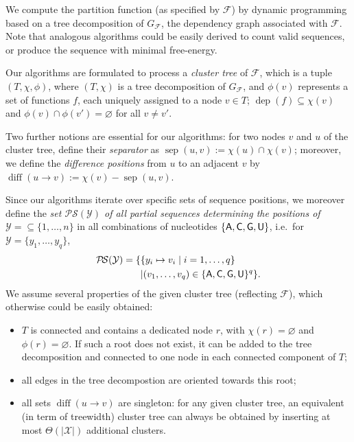 \documentclass[twocolumn]{bmcart}%
\newcommand{\dep}{\operatorname{dep}}
\newcommand{\separator}[2]{\operatorname{sep}(#1,#2)}
\newcommand{\difference}[2]{\operatorname{diff}(#1 \rightarrow #2)}
\newcommand{\partseqs}{\mathcal{P\!S}}
\newcommand{\F}{\mathcal{F}}
\newcommand{\X}{\mathcal{X}}
\newcommand{\Y}{\mathcal{Y}}
\newcommand{\Def}[1]{\emph{#1}}
\newcommand{\Nuc}[1]{{\sf #1}}
\newcommand{\Ab}{\Nuc{A}}
\newcommand{\Cb}{\Nuc{C}}
\newcommand{\Gb}{\Nuc{G}}
\newcommand{\Ub}{\Nuc{U}}
\begin{document}
We compute the partition function (as specified by $\F$) by dynamic programming based
on a tree decomposition of $G_{\F}$, the dependency graph associated with $\F$.
Note that analogous algorithms could be easily derived to count valid sequences, or produce the sequence with minimal free-energy.

%

Our algorithms are formulated to process a \Def{cluster tree} of $\F$, which is a tuple $(T,\chi,\phi)$, where
$(T,\chi)$ is a tree decomposition of $G_\F$, and $\phi(v)$ represents
a set of functions $f$, each uniquely assigned to a node $v\in T$;
$\dep(f)\subseteq\chi(v)$ and $\phi(v)\cap \phi(v')=\varnothing$ for
all $v\neq v'$. 

Two further notions are essential for our algorithms: for two nodes $v$ and $u$ of the cluster tree, define
their \Def{separator} as $\separator{u}{v} := \chi(u)\cap\chi(v)$;
moreover, we define the \Def{difference positions} from $u$ to an
adjacent $v$ by $\difference{u}{v}:=\chi(v) - \separator{u}{v}$.

Since our algorithms iterate over specific sets of sequence positions, we moreover define
the \Def{set $\partseqs(\Y)$ of all partial sequences determining the positions of $\Y=\subseteq\{1,\dots,n\}$} in all combinations of nucleotides $\{\Ab,\Cb,\Gb,\Ub\}$,
i.e.~for $\Y=\{y_1,\dots,y_{q}\}$,
\begin{align*}
\partseqs(\Y) = \{ & \{ y_i\mapsto v_i \mid i=1,\dots,q \} \\& | (v_1,\dots,v_{q}) \in \{\Ab,\Cb,\Gb,\Ub\}^{q} \}.
\end{align*}
%
We assume several properties of the given cluster tree (reflecting $\F$), which otherwise could be easily obtained:
\begin{itemize}
\item
$T$ is
connected and contains a dedicated node $r$, with
$\chi(r)=\varnothing$ and $\phi(r)=\varnothing$. If such a root does not exist, it can be added to the tree decomposition and connected to one node in each connected component of $T$;
\item
all edges in the tree decompostion are oriented towards this root;
\item
all sets $\difference{u}{v}$ are singleton: for any given
cluster tree, an equivalent (in term of treewidth) cluster tree can
always be obtained by inserting at most $\Theta(|\X|)$ additional
clusters.
\end{itemize}
\end{document}
